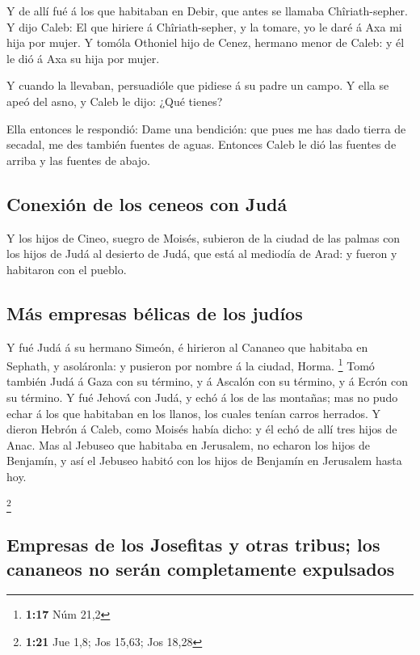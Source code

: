  Y de allí fué á los que habitaban en Debir, que antes se
llamaba Chîriath-sepher.  Y dijo Caleb: El que hiriere á
Chîriath-sepher, y la tomare, yo le daré á Axa mi hija por mujer.
 Y tomóla Othoniel hijo de Cenez, hermano menor de Caleb: y
él le dió á Axa su hija por mujer.

 Y cuando la llevaban, persuadióle que pidiese á su padre
un campo. Y ella se apeó del asno, y Caleb le dijo: ¿Qué tienes?

 Ella entonces le respondió: Dame una bendición: que pues
me has dado tierra de secadal, me des también fuentes de aguas. Entonces
Caleb le dió las fuentes de arriba y las fuentes de abajo.

\hypertarget{conexiuxf3n-de-los-ceneos-con-juduxe1}{%
\subsection{Conexión de los ceneos con
Judá}\label{conexiuxf3n-de-los-ceneos-con-juduxe1}}

 Y los hijos de Cineo, suegro de Moisés, subieron de la
ciudad de las palmas con los hijos de Judá al desierto de Judá, que está
al mediodía de Arad: y fueron y habitaron con el pueblo.

\hypertarget{muxe1s-empresas-buxe9licas-de-los-juduxedos}{%
\subsection{Más empresas bélicas de los
judíos}\label{muxe1s-empresas-buxe9licas-de-los-juduxedos}}

 Y fué Judá á su hermano Simeón, é hirieron al Cananeo que
habitaba en Sephath, y asoláronla: y pusieron por nombre á la ciudad,
Horma. \footnote{\textbf{1:17} Núm 21,2}  Tomó también Judá
á Gaza con su término, y á Ascalón con su término, y á Ecrón con su
término.  Y fué Jehová con Judá, y echó á los de las
montañas; mas no pudo echar á los que habitaban en los llanos, los
cuales tenían carros herrados.  Y dieron Hebrón á Caleb,
como Moisés había dicho: y él echó de allí tres hijos de Anac.
 Mas al Jebuseo que habitaba en Jerusalem, no echaron los
hijos de Benjamín, y así el Jebuseo habitó con los hijos de Benjamín en
Jerusalem hasta hoy.

\footnote{\textbf{1:21} Jue 1,8; Jos 15,63; Jos 18,28}

\hypertarget{empresas-de-los-josefitas-y-otras-tribus-los-cananeos-no-seruxe1n-completamente-expulsados}{%
\subsection{Empresas de los Josefitas y otras tribus; los cananeos no
serán completamente
expulsados}\label{empresas-de-los-josefitas-y-otras-tribus-los-cananeos-no-seruxe1n-completamente-expulsados}}

